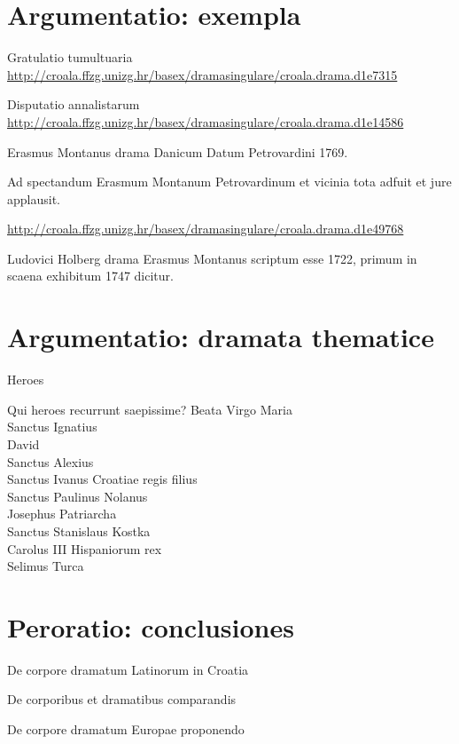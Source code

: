 \documentclass[14pt]{beamer}
\begin{document}
\section{Argumentatio: exempla}

\begin{frame}{Gratulatio tumultuaria}
  \url{http://croala.ffzg.unizg.hr/basex/dramasingulare/croala.drama.d1e7315}
\end{frame}

\begin{frame}{Disputatio annalistarum}
  \url{http://croala.ffzg.unizg.hr/basex/dramasingulare/croala.drama.d1e14586}
\end{frame}

\begin{frame}{Erasmus Montanus drama Danicum}
  Datum Petrovardini 1769.

  Ad spectandum Erasmum Montanum Petrovardinum et vicinia tota adfuit et jure applausit.
  
  \url{http://croala.ffzg.unizg.hr/basex/dramasingulare/croala.drama.d1e49768}

  Ludovici Holberg drama Erasmus Montanus scriptum esse 1722, primum in scaena exhibitum 1747 dicitur.
    \end{frame}

\section{Argumentatio: dramata thematice}

\begin{frame}
  Heroes
\end{frame}

\begin{frame}{Qui heroes recurrunt saepissime?}
  Beata Virgo Maria\\
  Sanctus Ignatius\\
  David\\
  Sanctus Alexius\\
  Sanctus Ivanus Croatiae regis filius\\
  Sanctus Paulinus Nolanus\\
  Josephus Patriarcha\\
  Sanctus Stanislaus Kostka\\
  Carolus III Hispaniorum rex\\
  Selimus Turca
  
\end{frame}

\section{Peroratio: conclusiones}

\begin{frame}{De corpore dramatum Latinorum in Croatia}
  
\end{frame}

\begin{frame}{De corporibus et dramatibus comparandis}
  
\end{frame}

\begin{frame}{De corpore dramatum Europae proponendo}
  
\end{frame}

  \maketitle
\end{document}
